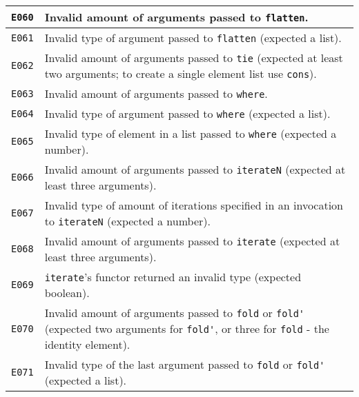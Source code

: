 \begin{longtable}{ | p{6em} | p{34em} | }
\verb|E060|          & Invalid amount of arguments passed to \verb|flatten|.                                                                                          \\ \hline
\verb|E061|          & Invalid type of argument passed to \verb|flatten| (expected a list).                                                                           \\ \hline
\verb|E062|          & Invalid amount of arguments passed to \verb|tie| (expected at least two arguments; to create a single element list use \verb|cons|).           \\ \hline
\verb|E063|          & Invalid amount of arguments passed to \verb|where|.                                                                                            \\ \hline
\verb|E064|          & Invalid type of argument passed to \verb|where| (expected a list).                                                                             \\ \hline
\verb|E065|          & Invalid type of element in a list passed to \verb|where| (expected a number).                                                                  \\ \hline
\verb|E066|          & Invalid amount of arguments passed to \verb|iterateN| (expected at least three arguments).                                                     \\ \hline
\verb|E067|          & Invalid type of amount of iterations specified in an invocation to \verb|iterateN| (expected a number).                                        \\ \hline
\verb|E068|          & Invalid amount of arguments passed to \verb|iterate| (expected at least three arguments).                                                      \\ \hline
\verb|E069|          & \verb|iterate|'s functor returned an invalid type (expected boolean).                                                                          \\ \hline
\verb|E070|          & Invalid amount of arguments passed to \verb|fold| or \verb|fold'| (expected two arguments for \verb|fold'|, or three for \verb|fold| - the identity element). \\ \hline
\verb|E071|          & Invalid type of the last argument passed to \verb|fold| or \verb|fold'| (expected a list).                                                     \\ \hline

\end{longtable}
